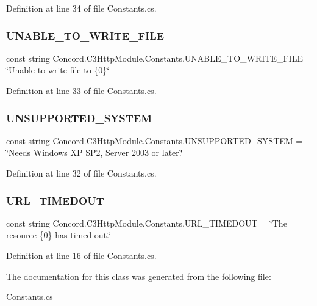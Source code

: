 Definition at line 34 of file Constants.\+cs.

\mbox{\label{class_concord_1_1_c3_http_module_1_1_constants_adf8bf81fd05fc55fa9fe9949ee910137}} 
\subsubsection{\texorpdfstring{UNABLE\_TO\_WRITE\_FILE}{UNABLE\_TO\_WRITE\_FILE}}
{\footnotesize\ttfamily const string Concord.\+C3\+Http\+Module.\+Constants.\+U\+N\+A\+B\+L\+E\+\_\+\+T\+O\+\_\+\+W\+R\+I\+T\+E\+\_\+\+F\+I\+LE = \char`\"{}Unable to write file to \{0\}\char`\"{}}



Definition at line 33 of file Constants.\+cs.

\mbox{\label{class_concord_1_1_c3_http_module_1_1_constants_aa5edf6e785a3b92128ad2d81b77c583e}} 
\subsubsection{\texorpdfstring{UNSUPPORTED\_SYSTEM}{UNSUPPORTED\_SYSTEM}}
{\footnotesize\ttfamily const string Concord.\+C3\+Http\+Module.\+Constants.\+U\+N\+S\+U\+P\+P\+O\+R\+T\+E\+D\+\_\+\+S\+Y\+S\+T\+EM = \char`\"{}Needs Windows XP S\+P2, Server 2003 or later.\char`\"{}}



Definition at line 32 of file Constants.\+cs.

\mbox{\label{class_concord_1_1_c3_http_module_1_1_constants_ac4f285e7b8206120e160fe11900c967a}} 
\subsubsection{\texorpdfstring{URL\_TIMEDOUT}{URL\_TIMEDOUT}}
{\footnotesize\ttfamily const string Concord.\+C3\+Http\+Module.\+Constants.\+U\+R\+L\+\_\+\+T\+I\+M\+E\+D\+O\+UT = \char`\"{}The resource \{0\} has timed out.\char`\"{}}



Definition at line 16 of file Constants.\+cs.



The documentation for this class was generated from the following file\+:\begin{DoxyCompactItemize}
\item 
\mbox{\hyperlink{_constants_8cs}{Constants.\+cs}}\end{DoxyCompactItemize}
